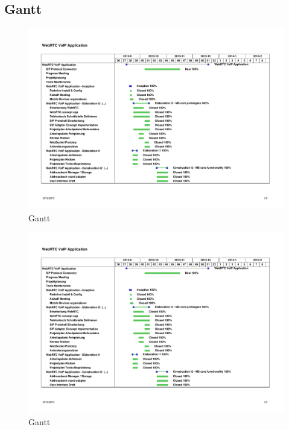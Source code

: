 	\begin{landscape}
	\subsection{Gantt}
		\begin{figure}[H]
			\centering
			\includegraphics[trim=1.5cm 2.5cm 1cm 3cm, clip=true,page=1,width=1.4\textwidth]{../projektplan/media/jsvoipcommunication-gantt.pdf}
			\caption[Gantt]{Gantt}
			\label{gantt}
		\end{figure}
		\begin{figure}[H]
			\centering
			\includegraphics[trim=1.5cm 2.5cm 1cm 1cm, clip=true,page=2,width=1.4\textwidth]{../projektplan/media/jsvoipcommunication-gantt.pdf}
			\caption[Gantt]{Gantt}
			\label{gantt}
		\end{figure}
	\end{landscape}
